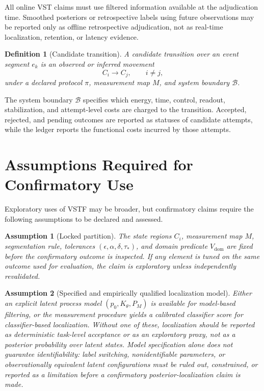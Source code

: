 \documentclass[11pt,a4paper]{article}
\newtheorem{definition}{Definition}
\newtheorem{assumption}{Assumption}
\newcommand{\1}{\mathbf{1}}
\begin{document}
All online VST claims must use filtered information available at the adjudication time. Smoothed posteriors or retrospective labels using future observations may be reported only as offline retrospective adjudication, not as real-time localization, retention, or latency evidence.

\begin{definition}[Candidate transition]
A candidate transition over an event segment $e_k$ is an observed or inferred movement
\[
  C_i \longrightarrow C_j,\qquad i \neq j,
\]
under a declared protocol $\pi$, measurement map $M$, and system boundary $\mathcal{B}$.
\end{definition}

The system boundary $\mathcal{B}$ specifies which energy, time, control, readout, stabilization, and attempt-level costs are charged to the transition. Accepted, rejected, and pending outcomes are reported as statuses of candidate attempts, while the ledger reports the functional costs incurred by those attempts.

\section{Assumptions Required for Confirmatory Use}

Exploratory uses of VSTF may be broader, but confirmatory claims require the following assumptions to be declared and assessed.

\begin{assumption}[Locked partition]
The state regions $C_i$, measurement map $M$, segmentation rule, tolerances $(\epsilon,\alpha,\delta,\tau_\ast)$, and domain predicate $V_{\mathrm{dom}}$ are fixed before the confirmatory outcome is inspected. If any element is tuned on the same outcome used for evaluation, the claim is exploratory unless independently revalidated.
\end{assumption}

\begin{assumption}[Specified and empirically qualified localization model]
Either an explicit latent process model $(p_0,K_\theta,P_M)$ is available for model-based filtering, or the measurement procedure yields a calibrated classifier score for classifier-based localization. Without one of these, localization should be reported as deterministic task-level acceptance or as an exploratory proxy, not as a posterior probability over latent states. Model specification alone does not guarantee identifiability: label switching, nonidentifiable parameters, or observationally equivalent latent configurations must be ruled out, constrained, or reported as a limitation before a confirmatory posterior-localization claim is made.
\end{assumption}
\end{document}

